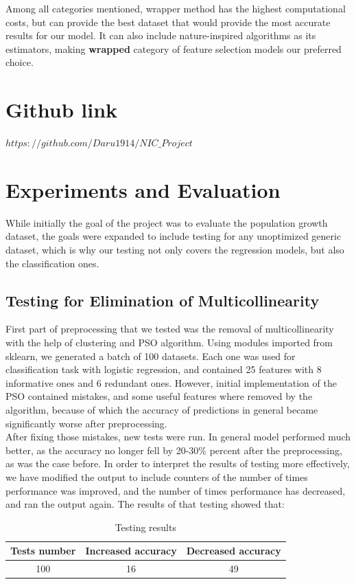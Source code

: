 \documentclass[conference]{IEEEtran}
\begin{document}
Among all categories mentioned, wrapper method has the highest computational costs, but can provide the best dataset that would provide the most accurate results for our model. It can also include nature-inspired algorithms as its estimators, making \textbf{wrapped} category of feature selection models our preferred choice. 

\section{Github link}
$https://github.com/Daru1914/NIC\_Project$

\section{Experiments and Evaluation}

While initially the goal of the project was to evaluate the population growth dataset, the goals were expanded to include testing for any unoptimized generic dataset, which is why our testing not only covers the regression models, but also the classification ones.

\subsection{Testing for Elimination of Multicollinearity}

First part of preprocessing that we tested was the removal of multicollinearity with the help of clustering and PSO algorithm. Using modules imported from sklearn, we generated a batch of 100 datasets. Each one was used for classification task with logistic regression, and contained 25 features with 8 informative ones and 6 redundant ones. However, initial implementation of the PSO contained mistakes, and some useful features where removed by the algorithm, because of which the accuracy of predictions in general became significantly worse after preprocessing.\\

After fixing those mistakes, new tests were run. In general model performed much better, as the accuracy no longer fell by 20-30\% percent after the preprocessing, as was the case before. In order to interpret the results of testing more effectively, we have modified the output to include counters of the number of times performance was improved, and the number of times performance has decreased, and ran the output again. The results of that testing showed that:

\begin{table}[htbp]
	\caption{Testing results}
	\begin{center}
		\begin{tabular}{|c|c|c|}
			\hline
			\textbf{Tests number}&\textbf{Increased accuracy}&\textbf{Decreased accuracy} \\
			\hline
			100&16&49\\
			\hline
		\end{tabular}
	\end{center}
\end{table}
\end{document}
